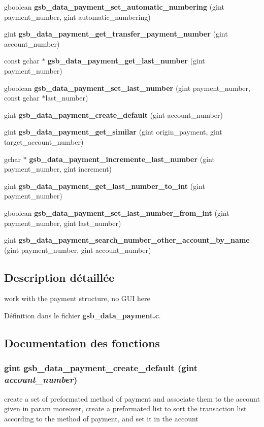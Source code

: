 \begin{DoxyCompactItemize}
gboolean {\bf gsb\_\-data\_\-payment\_\-set\_\-automatic\_\-numbering} (gint payment\_\-number, gint automatic\_\-numbering)
\item 
gint {\bf gsb\_\-data\_\-payment\_\-get\_\-transfer\_\-payment\_\-number} (gint account\_\-number)
\item 
const gchar $\ast$ {\bf gsb\_\-data\_\-payment\_\-get\_\-last\_\-number} (gint payment\_\-number)
\item 
gboolean {\bf gsb\_\-data\_\-payment\_\-set\_\-last\_\-number} (gint payment\_\-number, const gchar $\ast$last\_\-number)
\item 
gint {\bf gsb\_\-data\_\-payment\_\-create\_\-default} (gint account\_\-number)
\item 
gint {\bf gsb\_\-data\_\-payment\_\-get\_\-similar} (gint origin\_\-payment, gint target\_\-account\_\-number)
\item 
gchar $\ast$ {\bf gsb\_\-data\_\-payment\_\-incremente\_\-last\_\-number} (gint payment\_\-number, gint increment)
\item 
gint {\bf gsb\_\-data\_\-payment\_\-get\_\-last\_\-number\_\-to\_\-int} (gint payment\_\-number)
\item 
gboolean {\bf gsb\_\-data\_\-payment\_\-set\_\-last\_\-number\_\-from\_\-int} (gint payment\_\-number, gint last\_\-number)
\item 
gint {\bf gsb\_\-data\_\-payment\_\-search\_\-number\_\-other\_\-account\_\-by\_\-name} (gint payment\_\-number, gint account\_\-number)
\end{DoxyCompactItemize}


\subsection{Description détaillée}
work with the payment structure, no GUI here 

Définition dans le fichier {\bf gsb\_\-data\_\-payment.c}.



\subsection{Documentation des fonctions}
\subsubsection[{gsb\_\-data\_\-payment\_\-create\_\-default}]{\setlength{\rightskip}{0pt plus 5cm}gint gsb\_\-data\_\-payment\_\-create\_\-default (gint {\em account\_\-number})}\label{gsb__data__payment_8c_ac5615b1d09ddb9d46e13d9cf552e1925}
create a set of preformated method of payment and associate them to the account given in param moreover, create a preformated list to sort the transaction list according to the method of payment, and set it in the account


